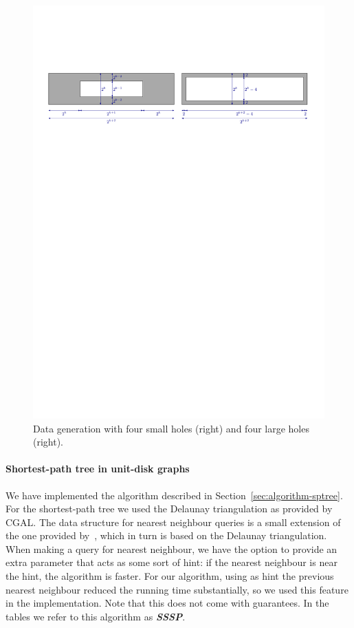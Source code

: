 \documentclass[a4paper,11pt]{article}
\def\DEF#1{\textbf{\emph{#1}}}
\begin{document}
\begin{figure}
	\includegraphics[width=\textwidth,page=2]{data_generation}
	\caption{Data generation with four small holes (right) and four large holes (right).}
	\label{fig:data_generation2}
\end{figure}


\paragraph{Shortest-path tree in unit-disk graphs}
We have implemented the algorithm described in Section~\ref{sec:algorithm-sptree}.
For the shortest-path tree we used the Delaunay triangulation as provided by CGAL.
The data structure for nearest neighbour queries is a small extension of
the one provided by~\cite{cgal:k-vda2-15a}, which in turn is based on the Delaunay triangulation.
When making a query for nearest neighbour, 
we have the option to provide an extra parameter that acts as some sort of hint: 
if the nearest neighbour is near the hint, the algorithm is faster. 
For our algorithm, using as hint the previous nearest neighbour 
reduced the running time substantially, so we used this feature in the implementation.
Note that this does not come with guarantees.
In the tables we refer to this algorithm as \DEF{SSSP}.
\end{document}
